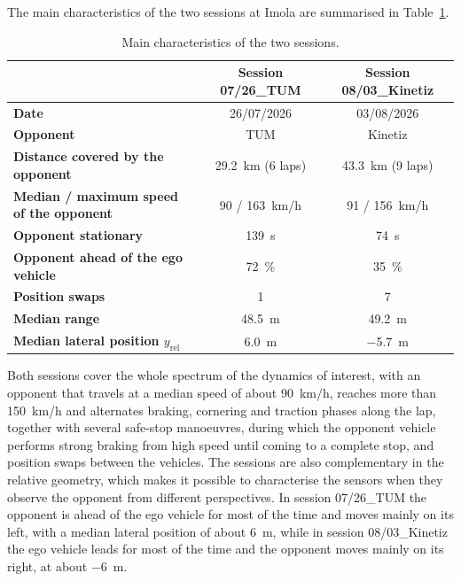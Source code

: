 The main characteristics of the two sessions at Imola are summarised in
Table~\ref{tab:sessions}.

\begin{table}[H]
    \centering
    \small
    \begin{tabular}{|>{\raggedright\arraybackslash}p{}cc|}
        \hline
                                             \rowcolor{bluepoli!40} & \textbf{Session 07/26\_TUM} & \textbf{Session 08/03\_Kinetiz} \\
        \hline\hline
        \textbf{Date} & 26/07/2026              & 03/08/2026 \\
        \textbf{Opponent} & TUM                     & Kinetiz \\
        \textbf{Distance covered by the opponent} & \SI{29.2}{km} (6 laps)  & \SI{43.3}{km} (9 laps) \\
        \textbf{Median / maximum speed of the opponent} & \SI{90}{} / \SI{163}{km/h} & \SI{91}{} / \SI{156}{km/h} \\
        \textbf{Opponent stationary} & \SI{139}{s}             & \SI{74}{s} \\
        \textbf{Opponent ahead of the ego vehicle} & \SI{72}{\percent}       & \SI{35}{\percent} \\
        \textbf{Position swaps} & 1                       & 7 \\
        \textbf{Median range} & \SI{48.5}{m}            & \SI{49.2}{m} \\
        \textbf{Median lateral position $y_{\mathrm{rel}}$} & \SI{6.0}{m}       & \SI{-5.7}{m} \\
        \hline
    \end{tabular}
    \caption{Main characteristics of the two sessions. }
    \label{tab:sessions}
\end{table}

Both sessions cover the whole spectrum of the dynamics of interest, with an opponent that
travels at a median speed of about \SI{90}{km/h}, reaches more than \SI{150}{km/h} and
alternates braking, cornering and traction phases along the lap, together with several safe-stop manoeuvres, during which the opponent vehicle performs strong braking from high speed until coming to a complete
stop, and position swaps between the vehicles. The sessions are also complementary in the relative
geometry, which makes it possible to characterise the sensors when they observe the
opponent from different perspectives. In session 07/26\_TUM the opponent is ahead of the
ego vehicle for most of the time and moves mainly on its left, with a median lateral
position of about \SI{6}{m}, while in session 08/03\_Kinetiz the ego vehicle leads for most
of the time and the opponent moves mainly on its right, at about \SI{-6}{m}.

